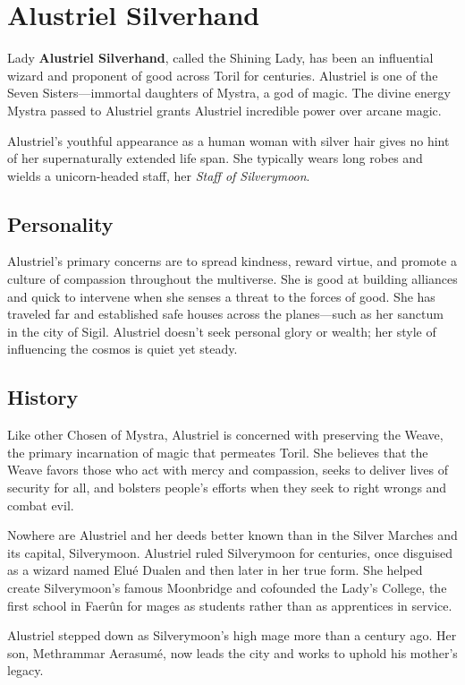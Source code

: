 \documentclass[10pt,a4paper,twoside,bg=print,twocolumn,openany,nodeprecatedcode]{dndbook}
\begin{document}
\section{Alustriel Silverhand}
Lady \textbf{Alustriel Silverhand}, called the Shining Lady, has been an influential wizard and proponent of good across Toril for centuries. Alustriel is one of the Seven Sisters—immortal daughters of Mystra, a god of magic. The divine energy Mystra passed to Alustriel grants Alustriel incredible power over arcane magic.

Alustriel's youthful appearance as a human woman with silver hair gives no hint of her supernaturally extended life span. She typically wears long robes and wields a unicorn-headed staff, her \textit{Staff of Silverymoon}.

\subsection{Personality}
Alustriel's primary concerns are to spread kindness, reward virtue, and promote a culture of compassion throughout the multiverse. She is good at building alliances and quick to intervene when she senses a threat to the forces of good. She has traveled far and established safe houses across the planes—such as her sanctum in the city of Sigil. Alustriel doesn't seek personal glory or wealth; her style of influencing the cosmos is quiet yet steady.

\subsection{History}
Like other Chosen of Mystra, Alustriel is concerned with preserving the Weave, the primary incarnation of magic that permeates Toril. She believes that the Weave favors those who act with mercy and compassion, seeks to deliver lives of security for all, and bolsters people's efforts when they seek to right wrongs and combat evil.

Nowhere are Alustriel and her deeds better known than in the Silver Marches and its capital, Silverymoon. Alustriel ruled Silverymoon for centuries, once disguised as a wizard named Elué Dualen and then later in her true form. She helped create Silverymoon's famous Moonbridge and cofounded the Lady's College, the first school in Faerûn for mages as students rather than as apprentices in service.

Alustriel stepped down as Silverymoon's high mage more than a century ago. Her son, Methrammar Aerasumé, now leads the city and works to uphold his mother's legacy.
\end{document}

